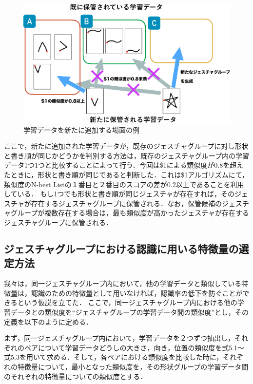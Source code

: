 \begin{figure} [h!]
	\begin{center}
		\includegraphics [width=0.9\hsize ]{img/make_gesture_group.eps}
	\end{center}
	\caption{学習データを新たに追加する場面の例}
	\label{fig:make_gesture_group}
\end{figure}

ここで，新たに追加された学習データが，既存のジェスチャグループに対し形状と書き順が同じかどうかを判別する方法は，既存のジェスチャグループ内の学習データ1つ1つと比較することによって行う．今回は\$1による類似度が0.8を超えたときに，形状と書き順が同じであると判断した．これは\$1アルゴリズムにて，類似度のN-best Listの１番目と２番目のスコアの差が0.2以上であることを利用している．
もし1つでも形状と書き順が同じジェスチャが存在すれば，そのジェスチャが存在するジェスチャグループに保管される．なお，保管候補のジェスチャグループが複数存在する場合は，最も類似度が高かったジェスチャが存在するジェスチャグループに保管される．


\subsection{ジェスチャグループにおける認識に用いる特徴量の選定方法}
我々は，同一ジェスチャグループ内において，他の学習データと類似している特徴量は，認識のための特徴量として用いなければ，認識率の低下を防ぐことができるという仮説を立てた．
ここで，同一ジェスチャグループ内における他の学習データとの類似度を``ジェスチャグループの学習データ間の類似度''とし，その定義を以下のように定める．

まず，同一ジェスチャグループ内において，学習データを２つずつ抽出し，それぞれのペアについて学習データどうしの大きさ，向き，位置の類似度を式5.1〜式5.3を用いて求める．そして，各ペアにおける類似度を比較した時に，それぞれの特徴量について，最小となった類似度を，その形状グループの学習データ間のそれぞれの特徴量についての類似度とする．

